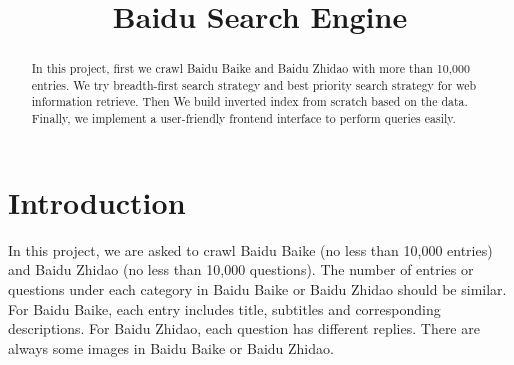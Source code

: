 \documentclass[10pt,times,twocolumn]{article}
\title{Baidu Search Engine}
\author{\anonymize{Chao Gao} \and
        \anonymize{Yinchu Wu} \and
        \anonymize{Peilin Wu}}
\begin{document}
\maketitle

\begin{abstract}
In this project, first we crawl Baidu Baike and Baidu Zhidao with more than 10,000 entries. We try breadth-first search strategy and best priority search strategy for web information retrieve.
Then We build inverted index from scratch based on the data. Finally, we implement a user-friendly 
frontend interface to perform queries easily.  
\end{abstract}


\section{Introduction}\label{sec:gen}
In this project, we are asked to crawl Baidu Baike (no less than 10,000 entries) and Baidu Zhidao (no less than 10,000 questions). The number of entries or questions under each category in Baidu Baike or Baidu Zhidao should be similar. For Baidu Baike, each entry includes title, subtitles and corresponding descriptions. For Baidu Zhidao, each question has different replies. There are always some images in Baidu Baike or Baidu Zhidao.
\end{document}

